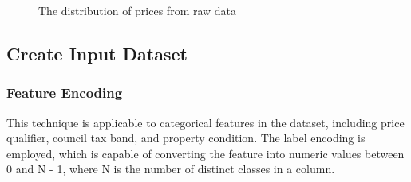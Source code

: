 \documentclass[12pt,twoside]{report}
\begin{document}
\begin{figure}[!htbp]
	\centering
	\hfill
	\hfill
	\caption{The distribution of prices from raw data}
	\label{price_raw}
\end{figure}

\subsection{Create Input Dataset}
\label{create_input_dataset_section}
\subsubsection{Feature Encoding}
This technique is applicable to categorical features in the dataset, including price qualifier, council tax band, and property condition. The label encoding is employed, which is capable of converting the feature into numeric values between 0 and N - 1, where N is the number of distinct classes in a column.
\end{document}
